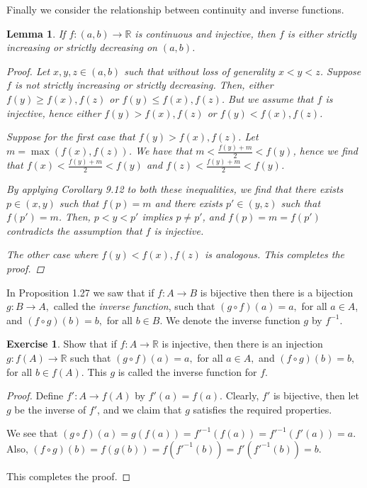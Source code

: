 \documentclass[11pt]{article}
\newcommand{\bbR}{\mathbb{R}}
\renewcommand{\_}[1]{\underline{ #1 }}
\newtheorem{lemma}[theorem]{Lemma}
\theoremstyle{definition}
\newtheorem{exercise}[theorem]{Exercise}
\numberwithin{equation}{subsection}
\begin{document}
Finally we consider the relationship between continuity and inverse functions.

\begin{lemma}
If $f:(a,b)\to\bbR$ is continuous and injective, then $f$ is either strictly increasing or strictly decreasing on $(a,b)$.

\begin{proof}
Let $x,y,z\in (a,b)$ such that without loss of generality $x<y<z$. Suppose $f$ is not strictly increasing or strictly decreasing. Then, either $f(y)\geq f(x),f(z)$ or $f(y)\leq f(x),f(z)$. But we assume that $f$ is injective, hence either $f(y)>f(x),f(z)$ or $f(y)< f(x),f(z)$. 

Suppose for the first case that $f(y)>f(x),f(z)$. Let $m = \max(f(x),f(z))$. We have that $m<\frac{f(y)+m}{2}<f(y)$, hence we find that $f(x)<\frac{f(y)+m}{2}<f(y)$ and $f(z)<\frac{f(y)+m}{2}<f(y)$. 

By applying Corollary 9.12 to both these inequalities, we find that there exists $p \in (x,y)$ such that $f(p)=m$ and there exists $p' \in (y,z)$ such that $f(p') = m$. Then, $p<y<p'$ implies $p\neq p'$, and $f(p)=m=f(p')$ contradicts the assumption that $f$ is injective.


The other case where $f(y)<f(x),f(z)$ is analogous. This completes the proof.



\renewcommand\qedsymbol{QED}
\end{proof}


\end{lemma}

In Proposition 1.27 we saw that if $f:A\longrightarrow B$ is bijective then there is a bijection $g:B\longrightarrow A,$ called the {\em inverse function},  such that $(g\circ f)(a)=a, $ for all $a\in A$, and $(f\circ g)(b)=b,$ for all $b\in B.$ 
We denote the inverse function $g$  by $f^{-1}$. 

\begin{exercise} 
Show that if $f\colon A\to \bbR$ is injective, then there is an injection $g:f(A)\to \bbR$  such that $(g\circ f)(a)=a,$ for all $a\in A,$ and $(f\circ g)(b)=b,$ for all $b\in f(A).$  
This $g$ is called the inverse function for $f.$

\begin{proof}
Define $f': A \rightarrow f(A)$ by $f'(a)=f(a)$. Clearly, $f'$ is bijective, then let $g$ be the inverse of $f'$, and we claim that $g$ satisfies the required properties. 

We see that $(g \circ f)(a)=g(f(a))=f'^{-1}(f(a))= f'^{-1}(f'(a))=a$. Also, $(f\circ g)(b)=f(g(b))=f(f'^{-1}(b))=f'(f'^{-1}(b))=b$.

This completes the proof.


\renewcommand\qedsymbol{QED}
\end{proof}


\end{exercise}
\end{document}
